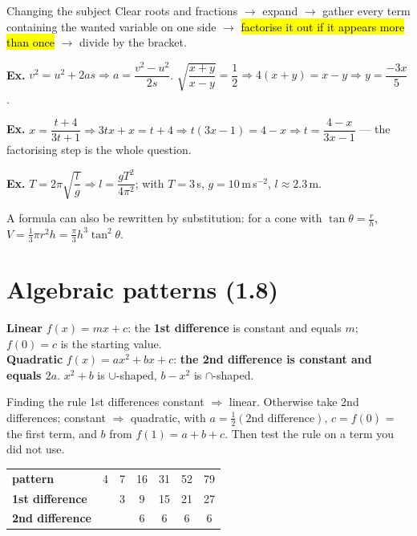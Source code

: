 \documentclass[11pt]{article}
\newcommand{\key}[1]{\hl{#1}}
\newcommand{\keyin}[1]{\textbf{\color{lilacdeep}#1}}  %
\newcommand{\wex}[1]{{\color{lilacdeep}\textbf{Ex.}} #1}
\begin{document}
\begin{methodbox}{Changing the subject}
Clear roots and fractions $\rightarrow$ expand $\rightarrow$ gather every term containing the wanted variable on one side $\rightarrow$ \key{factorise it out if it appears more than once} $\rightarrow$ divide by the bracket.
\end{methodbox}

\wex{$v^{2}=u^{2}+2as\Rightarrow a=\dfrac{v^{2}-u^{2}}{2s}$. \quad $\sqrt{\dfrac{x+y}{x-y}}=\dfrac12\Rightarrow4(x+y)=x-y\Rightarrow y=\dfrac{-3x}{5}$.}

\wex{$x=\dfrac{t+4}{3t+1}\Rightarrow3tx+x=t+4\Rightarrow t(3x-1)=4-x\Rightarrow t=\dfrac{4-x}{3x-1}$ --- the factorising step is the whole question.}

\wex{$T=2\pi\sqrt{\dfrac lg}\Rightarrow l=\dfrac{gT^{2}}{4\pi^{2}}$; with $T=3$\,s, $g=10$\,m\,s$^{-2}$, $l\approx2.3$\,m.}

A formula can also be rewritten by substitution: for a cone with $\tan\theta=\frac rh$, $V=\frac13\pi r^{2}h=\frac{\pi}{3}h^{3}\tan^{2}\theta$.

\section{Algebraic patterns (1.8)}

\begin{formulabox}
\textbf{Linear} $f(x)=mx+c$: the \textbf{1st difference} is constant and equals $m$; $f(0)=c$ is the starting value.\\
\textbf{Quadratic} $f(x)=ax^{2}+bx+c$: \keyin{the 2nd difference is constant and equals \mbox{$2a$}}. $x^{2}+b$ is $\cup$-shaped, $b-x^{2}$ is $\cap$-shaped.
\end{formulabox}

\begin{methodbox}{Finding the rule}
1st differences constant $\Rightarrow$ linear. Otherwise take 2nd differences; constant $\Rightarrow$ quadratic, with $a=\frac12(\text{2nd difference})$, $c=f(0)$ = the first term, and $b$ from $f(1)=a+b+c$. Then test the rule on a term you did not use.
\end{methodbox}

\begin{center}
\begin{tabular}{@{}l|cccccc@{}}
\textbf{pattern} & 4 & 7 & 16 & 31 & 52 & 79\\
\textbf{1st difference} & & 3 & 9 & 15 & 21 & 27\\
\textbf{2nd difference} & & & 6 & 6 & 6 & 6\\
\end{tabular}
\end{center}
\vspace{-0.3em}
\end{document}
